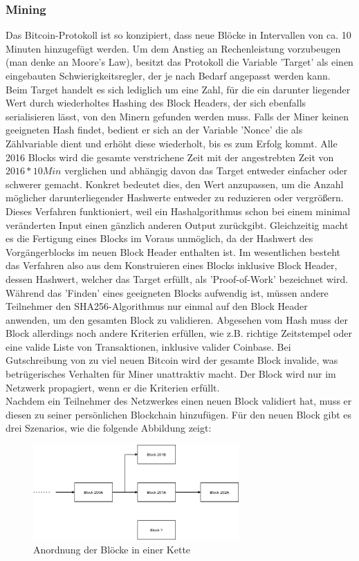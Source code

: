\subsubsection{Mining}
Das Bitcoin-Protokoll ist so konzipiert, dass neue Blöcke in Intervallen von ca. 10 Minuten hinzugefügt werden. 
Um dem Anstieg an Rechenleistung vorzubeugen (man denke an Moore's Law), besitzt das Protokoll die Variable 'Target' als einen eingebauten Schwierigkeitsregler, der je nach Bedarf angepasst werden kann.\\
Beim Target handelt es sich lediglich um eine Zahl, für die ein darunter liegender Wert durch wiederholtes Hashing des Block Headers, der sich ebenfalls serialisieren lässt, von den Minern gefunden werden muss. 
Falls der Miner keinen geeigneten Hash findet, bedient er sich an der Variable 'Nonce' die als Zählvariable dient und erhöht diese wiederholt, bis es zum Erfolg kommt.
Alle 2016 Blocks wird die gesamte verstrichene Zeit mit der angestrebten Zeit von $2016 * 10 Min$ verglichen und abhängig davon das Target entweder einfacher oder schwerer gemacht. 
Konkret bedeutet dies, den Wert anzupassen, um die Anzahl möglicher darunterliegender Hashwerte entweder zu reduzieren oder vergrößern.
Dieses Verfahren funktioniert, weil ein Hashalgorithmus schon bei einem minimal veränderten Input einen gänzlich anderen Output zurückgibt. 
Gleichzeitig macht es die Fertigung eines Blocks im Voraus unmöglich, da der Hashwert des Vorgängerblocks im neuen Block Header enthalten ist. 
Im wesentlichen besteht das Verfahren also aus dem Konstruieren eines Blocks inklusive Block Header, dessen Hashwert, welcher das Target erfüllt, als 'Proof-of-Work' bezeichnet wird.\\
Während das 'Finden' eines geeigneten Blocks aufwendig ist, müssen andere Teilnehmer den SHA256-Algorithmus nur einmal auf den Block Header anwenden, um den gesamten Block zu validieren. 
Abgesehen vom Hash muss der Block allerdings noch andere Kriterien erfüllen, wie z.B. richtige Zeitstempel oder eine valide Liste von Transaktionen, inklusive valider Coinbase. 
Bei Gutschreibung von zu viel neuen Bitcoin wird der gesamte Block invalide, was betrügerisches Verhalten für Miner unattraktiv macht. Der Block wird nur im Netzwerk propagiert, wenn er die Kriterien erfüllt.\\
Nachdem ein Teilnehmer des Netzwerkes einen neuen Block validiert hat, muss er diesen zu seiner persönlichen Blockchain hinzufügen. Für den neuen Block gibt es drei Szenarios, wie die folgende Abbildung zeigt:
\begin{figure}[htpb]
	\centering
	\includegraphics[width=0.7\textwidth]{images/chains.png}
	\caption{Anordnung der Blöcke in einer Kette}
	\label{6braun:fig:chains}
\end{figure}
